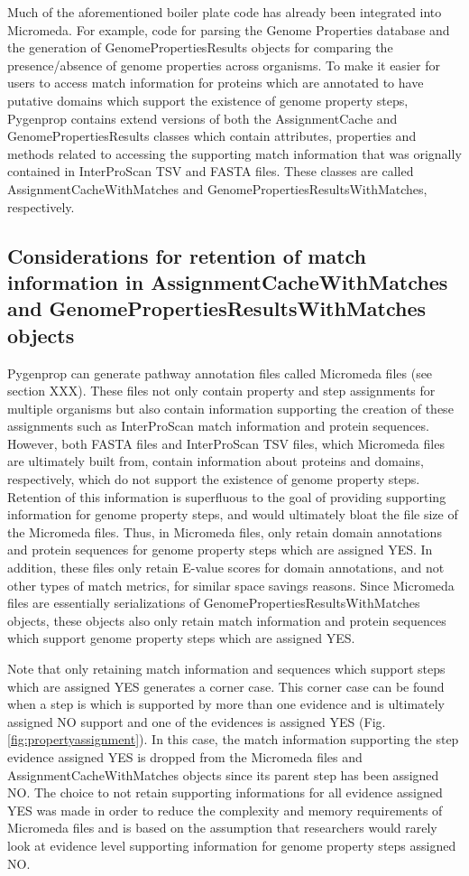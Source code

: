 Much of the aforementioned boiler plate code has already been integrated into Micromeda. For example, code for parsing the Genome Properties database and the generation of GenomePropertiesResults objects for comparing the presence/absence of genome properties across organisms. To make it easier for users to access match information for proteins which are annotated to have putative domains which support the existence of genome property steps, Pygenprop contains extend versions of both the AssignmentCache and GenomePropertiesResults classes which contain attributes, properties and methods related to accessing the supporting match information that was orignally contained in InterProScan TSV and FASTA files. These classes are called AssignmentCacheWithMatches and GenomePropertiesResultsWithMatches, respectively.

\subsection{Considerations for retention of match information in AssignmentCacheWithMatches and GenomePropertiesResultsWithMatches objects}

Pygenprop can generate pathway annotation files called Micromeda files (see section XXX). These files not only contain property and step assignments for multiple organisms but also contain information supporting the creation of these assignments such as InterProScan match information and protein sequences. However, both FASTA files and InterProScan TSV files, which Micromeda files are ultimately built from, contain information about proteins and domains, respectively, which do not support the existence of genome property steps. Retention of this information is superfluous to the goal of providing supporting information for genome property steps, and would ultimately bloat the file size of the Micromeda files. Thus, in Micromeda files, only retain domain annotations and protein sequences for genome property steps which are assigned YES. In addition, these files only retain E-value scores for domain annotations, and not other types of match metrics, for similar space savings reasons. Since Micromeda files are essentially serializations of GenomePropertiesResultsWithMatches objects, these objects also only retain match information and protein sequences which support genome property steps which are assigned YES. 

Note that only retaining match information and sequences which support steps which are assigned YES generates a corner case. This corner case can be found when a step is which is supported by more than one evidence and is ultimately assigned NO support and one of the evidences is assigned YES (Fig. \ref{fig:propertyassignment}). In this case, the match information supporting the step evidence assigned YES is dropped from the Micromeda files and AssignmentCacheWithMatches objects since its parent step has been assigned NO. The choice to not retain supporting informations for all evidence assigned YES was made in order to reduce the complexity and memory requirements of Micromeda files and is based on the assumption that researchers would rarely look at evidence level supporting information for genome property steps assigned NO.

